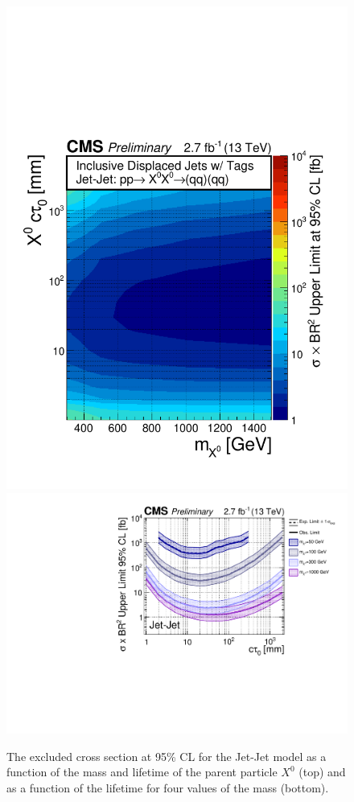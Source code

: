 \begin{figure}[tb]
\begin{center}

\includegraphics[width=.75\textwidth]{figures/pas//RESULT/UNBLINDED_LIMITS/Jet-Jet2D.pdf}
\includegraphics[width=.75\textwidth]{figures/pas//RESULT/UNBLINDED_LIMITS/Jet-Jet.pdf}
\caption{The excluded cross section at 95\% CL for the Jet-Jet model
  as a function of the mass and lifetime of the parent particle $X^0$
  (top) and as a function of the lifetime for four values of the mass
  (bottom).\label{fig:xx4j_limit}}
\end{center}
\end{figure}

